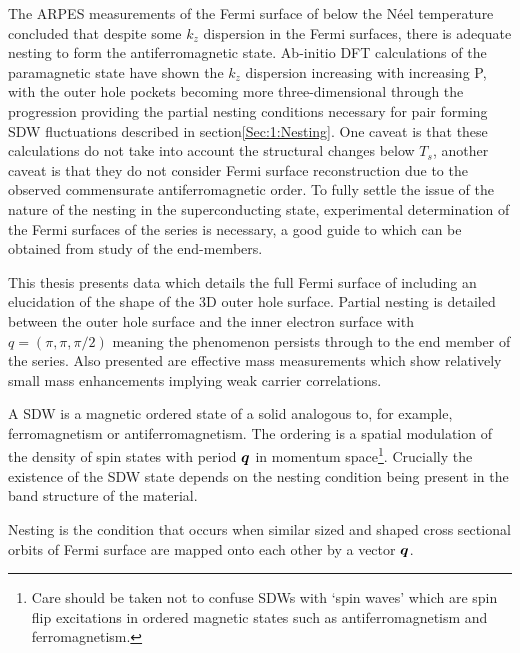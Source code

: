 The \ac{ARPES} measurements of the Fermi surface of \BaFeAs below the N\'eel temperature concluded that despite some $k_z$ dispersion in the Fermi surfaces, there is adequate nesting to form the antiferromagnetic state. Ab-initio DFT calculations\cite{Shishido2010} of the paramagnetic state have shown the $k_z$ dispersion increasing with increasing P, with the outer hole pockets becoming more three-dimensional through the progression providing the partial nesting conditions necessary for pair forming \ac{SDW} fluctuations described in section\ref{Sec:1:Nesting}. One caveat is that these calculations do not take into account the structural changes below $T_s$, another caveat is that they do not consider Fermi surface reconstruction due to the observed commensurate antiferromagnetic order. To fully settle the issue of the nature of the nesting in the superconducting state, experimental determination of the Fermi surfaces of the series is necessary, a good guide to which can be obtained from study of the end-members.


This thesis presents data which details the full Fermi surface of \BaFeP including an elucidation of the shape of the 3D outer hole surface. Partial nesting is detailed between the outer hole surface and the inner electron surface with $q=(\pi, \pi, \pi/2)$ meaning the phenomenon persists through to the end member of the series. Also presented are effective mass measurements which show relatively small mass enhancements implying weak carrier correlations.


A \acf{SDW} is a magnetic ordered state of a solid analogous to, for example, ferromagnetism or antiferromagnetism. The ordering is a spatial modulation of the density of spin states with period $\boldsymbol{q}$ in momentum space\footnote{Care should be taken not to confuse \acp{SDW} with `spin waves' which are spin flip excitations in ordered magnetic states such as antiferromagnetism and ferromagnetism.}. Crucially the existence of the \ac{SDW} state depends on the nesting condition being present in the band structure of the material.

Nesting is the condition that occurs when similar sized and shaped cross sectional orbits of Fermi surface are mapped onto each other by a vector $\boldsymbol{q}$.

